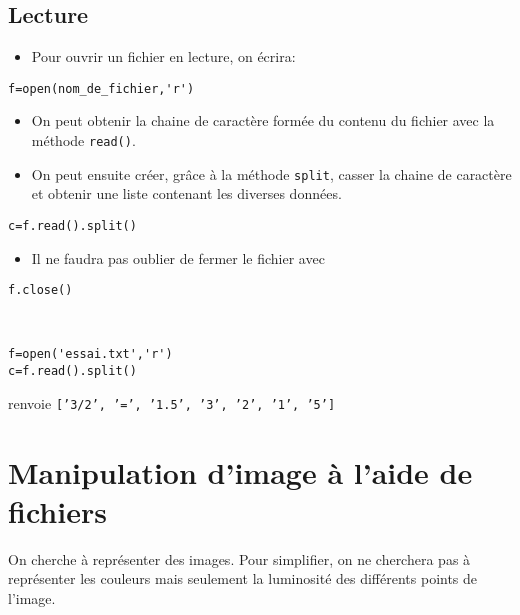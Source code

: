 \subsection*{Lecture}

\begin{itemize}
\item Pour ouvrir un fichier en lecture, on écrira:
\end{itemize}

\begin{lstlisting}
f=open(nom_de_fichier,'r')
\end{lstlisting}

\begin{itemize}
\item On peut obtenir la chaine de caractère formée du contenu du fichier avec la méthode \texttt{read()}.
\item On peut ensuite créer, grâce à la méthode \texttt{split}, casser la chaine de caractère et obtenir une liste contenant les diverses données.
\end{itemize}

\begin{lstlisting}
c=f.read().split()
\end{lstlisting}

\begin{itemize}
\item Il ne faudra pas oublier de fermer le fichier avec 
\end{itemize}
\begin{lstlisting}
f.close()
\end{lstlisting}

\begin{exemple}~\\
\begin{lstlisting}
f=open('essai.txt','r')
c=f.read().split()
\end{lstlisting}
\end{exemple}

renvoie \texttt{['3/2', '=', '1.5', '3', '2', '1', '5']}



\section*{Manipulation d'image à l'aide de fichiers}
	
	On cherche à représenter des  images. Pour simplifier, on ne cherchera
pas  à  représenter les  couleurs  mais  seulement  la luminosité  des
différents points de l'image.  

